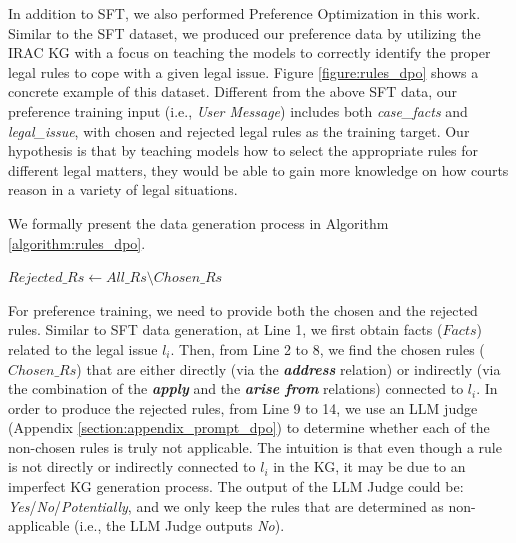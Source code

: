 In addition to SFT, we also performed Preference Optimization in this work. Similar to the SFT dataset, we produced our preference data by utilizing the IRAC KG with a focus on teaching the models to correctly identify the proper legal rules to cope with a given legal issue. Figure \ref{figure:rules_dpo} shows a concrete example of this dataset. Different from the above SFT data, our preference training input (i.e., \textit{User Message}) includes both \textit{case\_facts} and \textit{legal\_issue}, with chosen and rejected legal rules as the training target. Our hypothesis is that by teaching models how to select the appropriate rules for different legal matters, they would be able to gain more knowledge on how courts reason in a variety of legal situations.

We formally present the data generation process in Algorithm \ref{algorithm:rules_dpo}.
\begin{algorithm}[ht]
\caption{GenPref($KG, l_{i}, LJ$), $KG$ denotes the IRAC KG; $l_{i}$ is a legal issue in $KG$; an LLM Judge $LJ$ determines a rule's applicability to $l_{i}$.}
\label{algorithm:rules_dpo}

\begin{algorithmic}[1]
\EndFor
{}
\State $Rejected\_Rs \gets All\_Rs \setminus Chosen\_Rs$
	\EndIf
\EndFor
{}
\end{algorithmic}
\end{algorithm}
For preference training, we need to provide both the chosen and the rejected rules. Similar to SFT data generation, at Line 1, we first obtain facts ($Facts$) related to the legal issue $l_{i}$. Then, from Line 2 to 8, we find the chosen rules ($Chosen\_Rs$) that are either directly (via the \textit{\textbf{address}} relation) or indirectly (via the combination of the \textit{\textbf{apply}} and the \textit{\textbf{arise from}} relations) connected to $l_{i}$. In order to produce the rejected rules, from Line 9 to 14, we use an LLM judge (Appendix \ref{section:appendix_prompt_dpo}) to determine whether each of the non-chosen rules is truly not applicable. The intuition is that even though a rule is not directly or indirectly connected to $l_{i}$ in the KG, it may be due to an imperfect KG generation process. The output of the LLM Judge could be: \textit{Yes}/\textit{No}/\textit{Potentially}, and we only keep the rules that are determined as non-applicable (i.e., the LLM Judge outputs \textit{No}).

